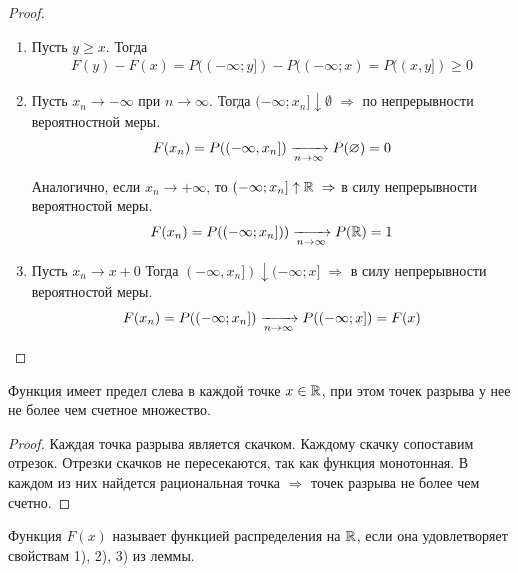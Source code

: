\begin{proof}~

	\begin{enumerate}
		\item 
			Пусть $y \geq x$. Тогда
			\begin{align*}
				F(y) - F(x) = P((-\infty; y]) - P((-\infty; x) = P((x, y]) \geq 0
			\end{align*}

		\item 
			Пусть $x_n \rightarrow -\infty$ при $n \rightarrow \infty$. 
			Тогда $(-\infty; x_n] \downarrow \emptyset\; \Rightarrow$ по непрерывности вероятностной меры.
			\begin{align*}
				F(x_n) = P((-\infty, x_n]) \xrightarrow[n \to \infty]{} P(\varnothing) = 0
			\end{align*}

			Аналогично, если $x_n \to +\infty$, то $(-\infty; x_n] \uparrow \mathbb{R}\; \Rightarrow$ 
			в силу непрерывности вероятностой меры.
			\begin{align*}
				F(x_n) = P((-\infty; x_n])) \xrightarrow[n \to \infty]{} P(\mathbb{R}) = 1
			\end{align*}

		\item 
			Пусть $x_n \to x + 0$ Тогда $(-\infty, x_n]) \downarrow (-\infty; x]\; \Rightarrow$ 
			в силу непрерывности вероятностой меры.
			\begin{align*}
				F(x_n) = P((-\infty; x_n]) \xrightarrow[n \to \infty]{} P((-\infty; x]) = F(x)
			\end{align*}
	\end{enumerate}
\end{proof}

\begin{corollary}
	Функция имеет предел слева в каждой точке $x \in \mathbb{R}$, при этом точек разрыва у нее не более чем счетное множество.

	\begin{proof}
		Каждая точка разрыва является скачком. Каждому скачку сопоставим отрезок.
		Отрезки скачков не пересекаются, так как функция монотонная. 
		В каждом из них найдется рациональная точка $\Rightarrow$ точек разрыва не более чем счетно.
	\end{proof}
\end{corollary}

\begin{definition}
	Функция $F(x)$ называет функцией распределения на $\mathbb{R}$, если она удовлетворяет свойствам 
	1), 2), 3) из леммы.
\end{definition}

